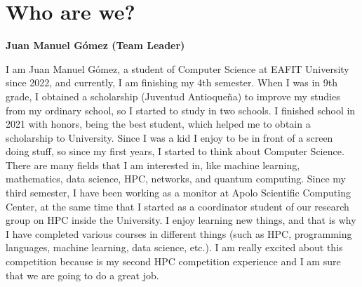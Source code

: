 \documentclass[11pt,a4paper,twocolumn]{article}
\begin{document}
\setlength{\parindent}{4em}
%



\section{Who are we?}

\begin{center}
    \textbf{Juan Manuel Gómez (Team Leader)}
\end{center}
I am Juan Manuel Gómez, a student of Computer Science at EAFIT University since 2022, and currently, I am finishing my 4th semester. When I was in 9th grade, I obtained a scholarship (Juventud Antioqueña) to improve my studies from my ordinary school, so I started to study in two schools. I finished school in 2021 with honors, being the best student, which helped me to obtain a scholarship to University. Since I was a kid I enjoy to be in front of a screen doing stuff, so since my first years, I started to think about Computer Science. There are many fields that I am interested in, like machine learning, mathematics, data science, HPC, networks, and quantum computing. Since my third semester, I have been working as a monitor at Apolo Scientific Computing Center, at the same time that I started as a coordinator student of our research group on HPC inside the University. I enjoy learning new things, and that is why I have completed various courses in different things (such as HPC, programming languages, machine learning, data science, etc.). I am really excited about this competition because is my second HPC competition experience and I am sure that we are going to do a great job.
\end{document}
